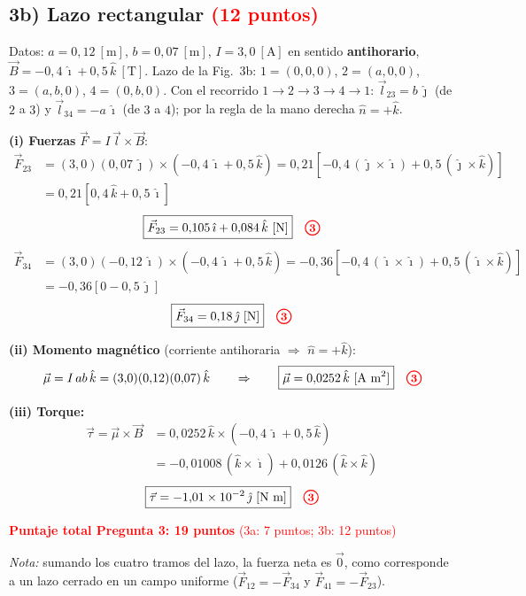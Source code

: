 \documentclass[12pt,letterpaper]{article}
\newcommand{\pts}[1]{\tikz[baseline=(c.base)]\node[circle,draw=red,text=red,thick,inner sep=1.3pt,font=\small\bfseries](c){#1};}
\begin{document}
\subsection*{3b) Lazo rectangular \quad\textcolor{red}{(12 puntos)}}

Datos: $a = 0{,}12\ [\text{m}]$, $b = 0{,}07\ [\text{m}]$, $I = 3{,}0\ [\text{A}]$ en sentido
\textbf{antihorario}, $\vec{B} = -0{,}4\,\hat{\imath} + 0{,}5\,\hat{k}\ [\text{T}]$.
Lazo de la Fig.~3b: $1=(0,0,0)$, $2=(a,0,0)$, $3=(a,b,0)$, $4=(0,b,0)$. Con el recorrido
$1\to2\to3\to4\to1$: $\vec{l}_{23} = b\,\hat{\jmath}$ (de $2$ a $3$) y $\vec{l}_{34} = -a\,\hat{\imath}$
(de $3$ a $4$); por la regla de la mano derecha $\hat{n} = +\hat{k}$.

\textbf{(i) Fuerzas} $\vec{F} = I\,\vec{l}\times\vec{B}$:
\begin{align*}
    \vec{F}_{23} &= (3{,}0)(0{,}07\,\hat{\jmath})\times(-0{,}4\,\hat{\imath} + 0{,}5\,\hat{k})
                  = 0{,}21\left[-0{,}4\,(\hat{\jmath}\times\hat{\imath}) + 0{,}5\,(\hat{\jmath}\times\hat{k})\right]\\
                 &= 0{,}21\left[0{,}4\,\hat{k} + 0{,}5\,\hat{\imath}\right]
\end{align*}
\[
    \boxed{\vec{F}_{23} = 0{,}105\,\hat{\imath} + 0{,}084\,\hat{k}\ [\text{N}]} \quad\pts{3}
\]
\begin{align*}
    \vec{F}_{34} &= (3{,}0)(-0{,}12\,\hat{\imath})\times(-0{,}4\,\hat{\imath} + 0{,}5\,\hat{k})
                  = -0{,}36\left[-0{,}4\,(\hat{\imath}\times\hat{\imath}) + 0{,}5\,(\hat{\imath}\times\hat{k})\right]\\
                 &= -0{,}36\left[0 - 0{,}5\,\hat{\jmath}\right]
\end{align*}
\[
    \boxed{\vec{F}_{34} = 0{,}18\,\hat{\jmath}\ [\text{N}]} \quad\pts{3}
\]

\textbf{(ii) Momento magn\'etico} (corriente antihoraria $\Rightarrow$ $\hat{n} = +\hat{k}$):
\[
    \vec{\mu} = I\,ab\,\hat{k} = (3{,}0)(0{,}12)(0{,}07)\,\hat{k}
    \qquad\Rightarrow\qquad
    \boxed{\vec{\mu} = 0{,}0252\,\hat{k}\ [\text{A m}^2]} \quad\pts{3}
\]

\textbf{(iii) Torque:}
\begin{align*}
    \vec{\tau} = \vec{\mu}\times\vec{B} &= 0{,}0252\,\hat{k}\times(-0{,}4\,\hat{\imath} + 0{,}5\,\hat{k})\\
               &= -0{,}01008\,(\hat{k}\times\hat{\imath}) + 0{,}0126\,(\hat{k}\times\hat{k})
\end{align*}
\[
    \boxed{\vec{\tau} = -1{,}01\times10^{-2}\,\hat{\jmath}\ [\text{N m}]} \quad\pts{3}
\]

\medskip
\noindent\textcolor{red}{\textbf{Puntaje total Pregunta 3: 19 puntos}} \textcolor{red}{(3a: 7 puntos; 3b: 12 puntos)}

\medskip
\textit{Nota:} sumando los cuatro tramos del lazo, la fuerza neta es $\vec{0}$, como corresponde a un
lazo cerrado en un campo uniforme ($\vec{F}_{12} = -\vec{F}_{34}$ y $\vec{F}_{41} = -\vec{F}_{23}$).
\end{document}
